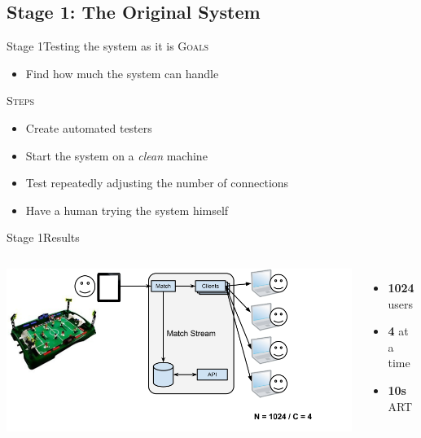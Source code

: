 \documentclass[utf8]{beamer}
\begin{document}
\subsection{Stage 1: The Original System}
\begin{frame}{Stage 1}{Testing the system as it is}
	\textsc{Goals}
	\begin{itemize}
		\item Find how much the system can handle
	\end{itemize}
	\pause
	\textsc{Steps}
	\begin{itemize}
		\item Create automated testers
		\item Start the system on a \emph{clean} machine
		\item Test repeatedly adjusting the number of connections
		\item Have a human trying the system himself
	\end{itemize}
\end{frame}
\begin{frame}{Stage 1}{Results}
	\begin{columns}
			\includegraphics[top=-1,width=\textwidth]{img/MatchStream-1.png}
			\begin{itemize}
				\item \textbf{\Large 1024} users
				\item \textbf{\Large 4} at a time
				\item \textbf{\Large 10s} ART
			\end{itemize}
	\end{columns}
\end{frame}
\end{document}
